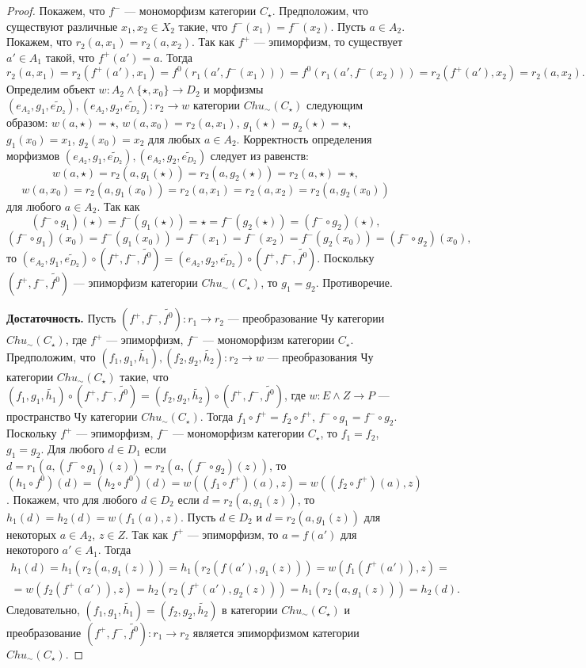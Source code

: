 \documentclass[a4paper,12pt]{article}
\newcommand{\fo}{\widetilde{f^0}}
\begin{document}
\begin{proof}
    Покажем, что $f^-$ --- мономорфизм категории $C_\star$. Предположим, что существуют различные $x_1, x_2 \in X_2$ такие, что $f^-(x_1) = f^-(x_2)$. Пусть $a \in A_2$. Покажем, что $r_2(a,x_1) = r_2(a,x_2)$. Так как $f^+$ --- эпиморфизм, то существует $a' \in A_1$ такой, что $f^+(a') = a$. Тогда
    $$
        r_2(a,x_1) = r_2(f^+(a'),x_1) = f^0(r_1(a',f^-(x_1))) = f^0(r_1(a',f^-(x_2))) = r_2(f^+(a'),x_2) = r_2(a,x_2).
    $$
    Определим объект $w: A_2 \wedge \{\star,x_0\} \to D_2$ и морфизмы $(e_{A_2},g_1,\widetilde{e_{D_2}}), (e_{A_2},g_2,\widetilde{e_{D_2}}): r_2 \to w$ категории $Chu_\sim(C_\star)$ следующим образом: $w(a,\star) = \star$, $w(a,x_0) = r_2(a,x_1)$, $g_1(\star) = g_2(\star) = \star$, $g_1(x_0) = x_1$, $g_2(x_0) = x_2$ для любых $a \in A_2$. Корректность определения морфизмов $(e_{A_2},g_1,\widetilde{e_{D_2}}), (e_{A_2},g_2,\widetilde{e_{D_2}})$ следует из равенств:
    $$
        w(a,\star) = r_2(a,g_1(\star)) = r_2(a,g_2(\star)) = r_2(a,\star) = \star,
    $$
    $$
        w(a,x_0) = r_2(a,g_1(x_0)) = r_2(a,x_1) = r_2(a,x_2) = r_2(a,g_2(x_0))
    $$
    для любого $a \in A_2$. Так как
    $$
        (f^- \circ g_1)(\star) = f^-(g_1(\star)) = \star = f^-(g_2(\star)) = (f^- \circ g_2)(\star),
    $$
    $$
        (f^- \circ g_1)(x_0) = f^-(g_1(x_0)) = f^-(x_1) = f^-(x_2) = f^-(g_2(x_0)) = (f^- \circ g_2)(x_0),
    $$
    то $(e_{A_2},g_1,\widetilde{e_{D_2}}) \circ (f^+,f^-,\fo) = (e_{A_2},g_2,\widetilde{e_{D_2}}) \circ (f^+,f^-,\fo)$. Поскольку $(f^+,f^-,\fo)$ --- эпиморфизм категории $Chu_\sim(C_\star)$, то $g_1 = g_2$. Противоречие.

    \textbf{Достаточность.} Пусть $(f^+,f^-,\fo): r_1 \to r_2$ --- преобразование Чу категории $Chu_\sim(C_\star)$, где $f^+$ --- эпиморфизм, $f^-$ --- мономорфизм категории $C_{\star}$. Предположим, что $(f_1,g_1,\widetilde{h_1}), (f_2,g_2,\widetilde{h_2}): r_2 \to w$ --- преобразования Чу категории $Chu_\sim(C_\star)$ такие, что $(f_1,g_1,\widetilde{h_1}) \circ (f^+,f^-,\fo) = (f_2,g_2,\widetilde{h_2}) \circ (f^+,f^-,\fo)$, где $w: E \wedge Z \to P$ --- пространство Чу категории $Chu_\sim(C_\star)$. Тогда $f_1 \circ f^+ = f_2 \circ f^+$, $f^- \circ g_1 = f^- \circ g_2$. Поскольку $f^+$ --- эпиморфизм, $f^-$ --- мономорфизм категории $C_\star$, то $f_1 = f_2$, $g_1 = g_2$. Для любого $d \in D_1$ если $d = r_1(a,(f^- \circ g_1)(z)) = r_2(a,(f^- \circ g_2)(z))$, то $(h_1 \circ f^0)(d) = (h_2 \circ f^0)(d) = w((f_1 \circ f^+)(a), z) = w((f_2 \circ f^+)(a), z)$. Покажем, что для любого $d \in D_2$ если $d = r_2(a,g_1(z))$, то $h_1(d) = h_2(d) = w(f_1(a),z)$. Пусть $d \in D_2$ и $d = r_2(a,g_1(z))$ для некоторых $a \in A_2$, $z \in Z$. Так как $f^+$ --- эпиморфизм, то $a = f(a')$ для некоторого $a' \in A_1$. Тогда 
    \begin{multline*}
        h_1(d) = h_1(r_2(a,g_1(z))) = h_1(r_2(f(a'),g_1(z))) = w(f_1(f^+(a')),z) =\\=
        w(f_2(f^+(a')),z) = h_2(r_2(f^+(a'),g_2(z))) = h_1(r_2(a,g_1(z))) = h_2(d).
    \end{multline*}
    Следовательно, $(f_1,g_1,\widetilde{h_1}) = (f_2,g_2,\widetilde{h_2})$ в категории $Chu_\sim(C_\star)$ и преобразование $(f^+,f^-,\fo): r_1 \to r_2$ является эпиморфизмом категории $Chu_\sim(C_\star)$.
\end{proof}
\end{document}
